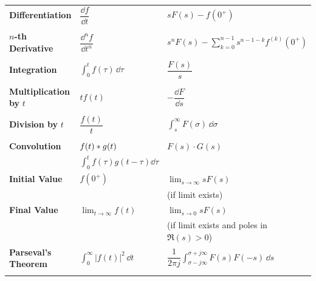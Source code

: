 \begin{longtable}{lll}
    \textbf{Differentiation} & $\dfrac{\dd f}{\dd t}$ & $sF(s) - f(0^+)$ \\
    & & \\

    \textbf{$n$-th Derivative} & $\dfrac{\dd^n f}{\dd t^n}$ & $s^n F(s) - \sum_{k=0}^{n-1} s^{n-1-k} f^{(k)}(0^+)$ \\
    & & \\

    \textbf{Integration} & $\int_0^t f(\tau) \, \dd\tau$ & $\dfrac{F(s)}{s}$ \\
    & & \\

    \textbf{Multiplication by } $t$ & $t f(t)$ & $-\dfrac{\dd F}{\dd s}$ \\
    & & \\

    \textbf{Division by } $t$ & $\dfrac{f(t)}{t}$ & $\int_s^{\infty} F(\sigma) \, \dd\sigma$ \\
    & & \\

    \textbf{Convolution} & $f(t) \ast g(t)$ & $F(s) \cdot G(s)$ \\
    & $\int_0^t f(\tau)g(t-\tau)\dd\tau$ & \\

    \textbf{Initial Value} & $f(0^+)$ & $\lim_{s \to \infty} s F(s)$ \\
    & & (if limit exists) \\

    \textbf{Final Value} & $\lim_{t \to \infty} f(t)$ & $\lim_{s \to 0} s F(s)$ \\
    & & (if limit exists and poles in $\Re(s) > 0$) \\

    \textbf{Parseval's Theorem} & $\int_0^{\infty} |f(t)|^2 \, \dd t$ & $\dfrac{1}{2\pi j} \int_{\sigma - j\infty}^{\sigma + j\infty} F(s) F(-s) \, \dd s$ \\
    & & \\

\end{longtable}

